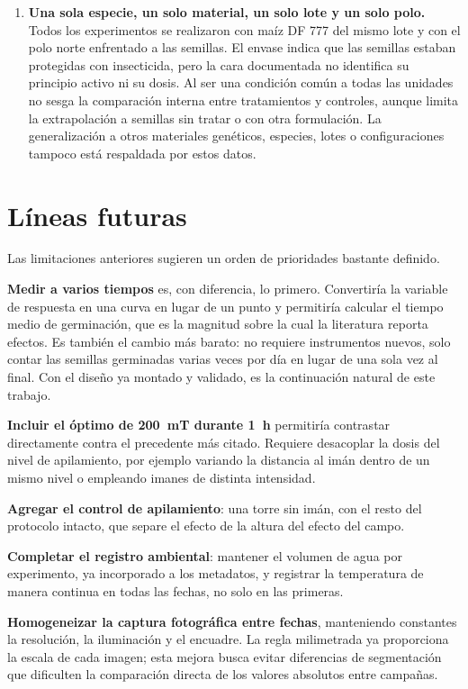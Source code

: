 \begin{enumerate}
    \item \textbf{Una sola especie, un solo material, un solo lote y un solo polo.} Todos los experimentos se realizaron con maíz DF 777 del mismo lote y con el polo norte enfrentado a las semillas. El envase indica que las semillas estaban protegidas con insecticida, pero la cara documentada no identifica su principio activo ni su dosis. Al ser una condición común a todas las unidades no sesga la comparación interna entre tratamientos y controles, aunque limita la extrapolación a semillas sin tratar o con otra formulación. La generalización a otros materiales genéticos, especies, lotes o configuraciones tampoco está respaldada por estos datos.
\end{enumerate}

\section{Líneas futuras}
\label{sec:disc_futuro}

Las limitaciones anteriores sugieren un orden de prioridades bastante definido.

\textbf{Medir a varios tiempos} es, con diferencia, lo primero. Convertiría la variable de respuesta en una curva en lugar de un punto y permitiría calcular el tiempo medio de germinación, que es la magnitud sobre la cual la literatura reporta efectos. Es también el cambio más barato: no requiere instrumentos nuevos, solo contar las semillas germinadas varias veces por día en lugar de una sola vez al final. Con el diseño ya montado y validado, es la continuación natural de este trabajo.

\textbf{Incluir el óptimo de 200~mT durante 1~h} permitiría contrastar directamente contra el precedente más citado. Requiere desacoplar la dosis del nivel de apilamiento, por ejemplo variando la distancia al imán dentro de un mismo nivel o empleando imanes de distinta intensidad.

\textbf{Agregar el control de apilamiento}: una torre sin imán, con el resto del protocolo intacto, que separe el efecto de la altura del efecto del campo.

\textbf{Completar el registro ambiental}: mantener el volumen de agua por experimento, ya incorporado a los metadatos, y registrar la temperatura de manera continua en todas las fechas, no solo en las primeras.

\textbf{Homogeneizar la captura fotográfica entre fechas}, manteniendo constantes la resolución, la iluminación y el encuadre. La regla milimetrada ya proporciona la escala de cada imagen; esta mejora busca evitar diferencias de segmentación que dificulten la comparación directa de los valores absolutos entre campañas.

